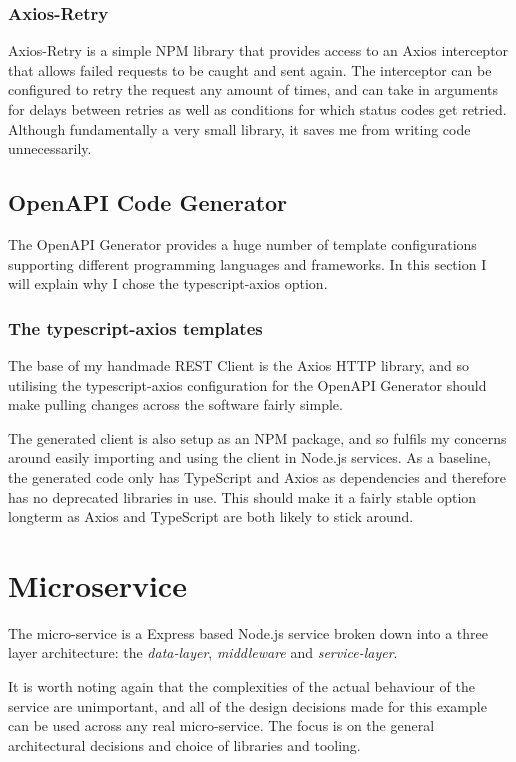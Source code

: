 \subsubsection{Axios-Retry}
Axios-Retry is a simple NPM library that provides access to an Axios interceptor that allows failed requests to be caught and sent again. The interceptor can be configured to retry the request any amount of times, and can take in arguments for delays between retries as well as conditions for which status codes get retried. Although fundamentally a very small library, it saves me from writing code unnecessarily. 

\subsection{OpenAPI Code Generator}
The OpenAPI Generator provides a huge number of template configurations supporting different programming languages and frameworks. In this section I will explain why I chose the typescript-axios option.
\subsubsection{The typescript-axios templates}
The base of my handmade REST Client is the Axios HTTP library, and so utilising the typescript-axios configuration for the OpenAPI Generator should make pulling changes across the software fairly simple.

The generated client is also setup as an NPM package, and so fulfils my concerns around easily importing and using the client in Node.js services. As a baseline, the generated code only has TypeScript and Axios as dependencies and therefore has no deprecated libraries in use. This should make it a fairly stable option longterm as Axios and TypeScript are both likely to stick around.

\section{Microservice}
The micro-service is a Express based Node.js service broken down into a three layer architecture: the \emph{data-layer}, \emph{middleware} and \emph{service-layer}.

It is worth noting again that the complexities of the actual behaviour of the service are unimportant, and all of the design decisions made for this example can be used across any real micro-service. The focus is on the general architectural decisions and choice of libraries and tooling.
